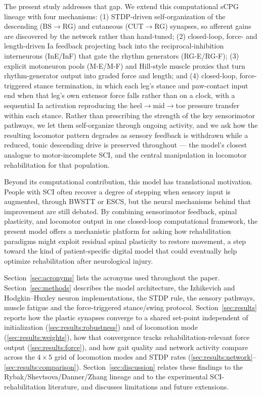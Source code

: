 The present study addresses that gap. We extend this computational sCPG
lineage with four mechanisms: (1) STDP-driven self-organization of the
descending (BS$\to$RG) and cutaneous (CUT$\to$RG) synapses, so afferent
gains are discovered by the network rather than hand-tuned; (2) closed-loop,
force- and length-driven Ia feedback projecting back into the
reciprocal-inhibition interneurons (InE/InF) that gate the rhythm generators
(RG-E/RG-F); (3) explicit motoneuron pools (M-E/M-F) and Hill-style muscle
proxies that turn rhythm-generator output into graded force and length; and
(4) closed-loop, force-triggered stance termination, in which each leg's
stance and paw-contact input end when that leg's own extensor force falls
rather than on a clock, with a sequential Ia activation reproducing the
heel$\to$mid$\to$toe pressure transfer within each stance. Rather than prescribing
the strength of the key sensorimotor pathways, we let them self-organize
through ongoing activity, and we ask how the resulting locomotor pattern
degrades as sensory feedback is withdrawn while a reduced, tonic
descending drive is preserved throughout --- the model's closest analogue
to motor-incomplete SCI, and the central manipulation in locomotor
rehabilitation for that population.

Beyond its computational contribution, this model has translational
motivation. People with SCI often recover a degree of stepping when sensory
input is augmented, through BWSTT or ESCS, but the neural mechanisms behind
that improvement are still debated. By combining sensorimotor feedback,
spinal plasticity, and locomotor output in one closed-loop computational
framework, the present model offers a mechanistic platform for asking how
rehabilitation paradigms might exploit residual spinal plasticity to restore
movement, a step toward the kind of patient-specific digital model that
could eventually help optimize rehabilitation after neurological injury.

Section~\ref{sec:acronyms} lists the acronyms used throughout the paper.
Section~\ref{sec:methods} describes the model architecture, the Izhikevich
and Hodgkin--Huxley neuron implementations, the STDP rule, the sensory
pathways, muscle fatigue and the force-triggered stance/swing protocol.
Section~\ref{sec:results} reports how the plastic synapses converge to a
shared set-point independent of initialization
(\autoref{sec:results:robustness}) and of locomotion mode
(\autoref{sec:results:weights}), how that convergence tracks
rehabilitation-relevant force output (\autoref{sec:results:force}), and how
gait quality and network activity compare across the $4\times5$ grid of
locomotion modes and STDP rates
(\autoref{sec:results:network}--\autoref{sec:results:comparison}). Section~\ref{sec:discussion}
relates these findings to the Rybak/Shevtsova/Danner/Zhang lineage and to the
experimental SCI-rehabilitation literature, and discusses limitations and
future extensions.
